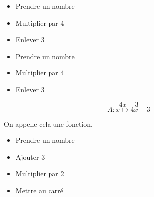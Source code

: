 \begin{frame}
    \begin{minipage}[t]{0.5\textwidth}
        \begin{itemize}
            \item Prendre un nombre 
            \item Multiplier par 4
            \item Enlever 3
        \end{itemize}
    \end{minipage}
    \hfil
    \vrule
    \hfil
    \begin{minipage}[t]{0.45\textwidth}
        
    \end{minipage}
\end{frame}

\begin{frame}
    \begin{minipage}[t]{0.5\textwidth}
        \begin{itemize}
            \item Prendre un nombre 
            \item Multiplier par 4
            \item Enlever 3
        \end{itemize}
    \end{minipage}
    \hfil
    \vrule
    \hfil
    \begin{minipage}[t]{0.45\textwidth}
        $$4x-3$$
        \vfil
        $$A:x\mapsto 4x-3$$ 

        On appelle cela une fonction.
    \end{minipage}
\end{frame}

\begin{frame}
    \begin{minipage}[t]{0.5\textwidth}
        \begin{itemize}
            \item Prendre un nombre 
            \item Ajouter 3
            \item Multiplier par 2
            \item Mettre au carré
        \end{itemize}
    \end{minipage}
    \hfil
    \vrule
    \hfil
    \begin{minipage}[t]{0.45\textwidth}
    \end{minipage}
\end{frame}

